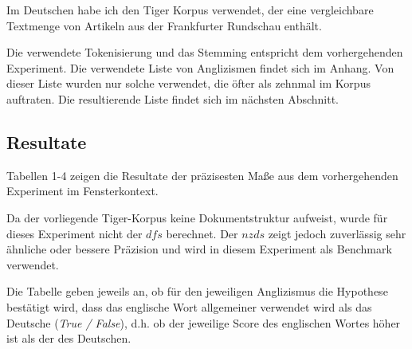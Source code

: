 \documentclass[11pt,numbers=noenddot]{scrartcl}
\begin{document}
Im Deutschen habe ich den Tiger Korpus \citep{Brants2004} verwendet, der eine vergleichbare Textmenge von Artikeln aus der Frankfurter Rundschau enthält.

Die verwendete Tokenisierung und das Stemming entspricht dem vorhergehenden Experiment. Die verwendete Liste von Anglizismen findet sich im Anhang. Von dieser Liste wurden nur solche verwendet, die öfter als zehnmal im Korpus auftraten. Die resultierende Liste findet sich im nächsten Abschnitt.

\subsection{Resultate}

Tabellen 1-4 zeigen die Resultate der präzisesten Maße aus dem vorhergehenden Experiment im Fensterkontext.

Da der vorliegende Tiger-Korpus keine Dokumentstruktur aufweist, wurde für dieses Experiment nicht der $dfs$ berechnet. Der $nzds$ zeigt jedoch zuverlässig sehr ähnliche oder bessere Präzision und wird in diesem Experiment als Benchmark verwendet.

Die Tabelle geben jeweils an, ob für den jeweiligen Anglizismus die Hypothese bestätigt wird, dass das englische Wort allgemeiner verwendet wird als das Deutsche (\emph{True / False}), d.h. ob der jeweilige Score des englischen Wortes höher ist als der des Deutschen.
\end{document}
